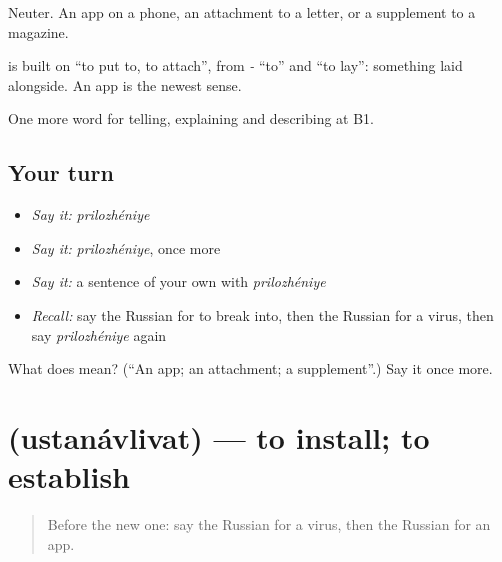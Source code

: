 Neuter. An app on a phone, an attachment to a letter, or a supplement to a magazine.

\begin{cousinweb}
\textbf{} is built on \emph{} \textquotedblleft{}to put to, to attach\textquotedblright{}, from \emph{-} \textquotedblleft{}to\textquotedblright{} and \emph{} \textquotedblleft{}to lay\textquotedblright{}: something laid alongside. An app is the newest sense.
\end{cousinweb}

\begin{grammarlens}[title={What you've built}]
One more word for telling, explaining and describing at B1.
\end{grammarlens}

\subsection*{Your turn}
\begin{itemize}
\raggedright
  \item \emph{Say it:} \emph{prilozhéniye}
  \item \emph{Say it:} \emph{prilozhéniye}, once more
  \item \emph{Say it:} a sentence of your own with \emph{prilozhéniye}
  \item \emph{Recall:} say the Russian for to break into, then the Russian for a virus, then say \emph{prilozhéniye} again
\end{itemize}

\begin{tcolorbox}[breakable,colback=teal!4,colframe=teal!35!black,title={Before you move on}]
What does  mean? (\textquotedblleft{}An app; an attachment; a supplement\textquotedblright{}.) Say it once more.
\end{tcolorbox}
\section[\texorpdfstring{\ru{устанавливать} (ustanávlivat)}{устанавливать (ustanávlivat)}]{ (ustanávlivat) — to install; to establish}

\label{lesson:RU-C401-ustanavlivat}



\begin{quote}
Before the new one: say the Russian for a virus, then the Russian for an app.
\end{quote}

